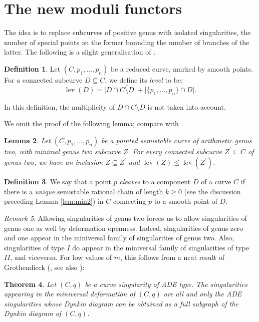 \documentclass{compositio}
\newcommand{\lev}{\operatorname{lev}}
\theoremstyle{plain}
\newtheorem{thm}{Theorem}[section]
\newtheorem{lem}[thm]{Lemma}
\theoremstyle{definition}
\newtheorem{definition}[thm]{Definition}
\theoremstyle{remark}
\newtheorem{rem}[thm]{Remark}
\begin{document}
\section{The new moduli functors}\label{sec:stability}
The idea is to replace subcurves of positive genus with isolated singularities, the number of special points on the former bounding the number of branches of the latter. The following is a slight generalisation of \cite[Definition 3.4]{SMY1}.
\begin{definition}
 Let $(C,p_1,\ldots,p_n)$ be a reduced curve, marked by smooth points. For a connected subcurve $D\subseteq C$, we define its \emph{level} to be: \[ \lev(D)=\lvert D\cap\overline{C\setminus D}\rvert+\lvert\{p_1,\ldots,p_n\}\cap D\rvert.\]
\end{definition}
In this definition, the multiplicity of $D\cap\overline{C\setminus D}$ is not taken into account.

We omit the proof of the following lemma; compare with \cite[Corollary 3.2, Lemma 3.5]{SMY1}.
\begin{lem}
 Let $(C,p_1,\ldots,p_n)$ be a pointed \emph{semistable} curve of arithmetic genus two, with minimal genus two subcurve $Z$. For every connected subcurve $Z^\prime\subseteq C$ of genus two, we have an inclusion $Z\subseteq Z^\prime$ and $\lev(Z)\leq\lev(Z^\prime)$.
\end{lem}

\begin{definition}
We say that a point $p$ \emph{cleaves} to a component $D$ of a curve $C$ if there is a \emph{unique} semistable rational chain of length $k\geq 0$ (see the discussion preceding Lemma \ref{lem:min2}) in $C$ connecting $p$ to a smooth point of $D$. 
\end{definition}


\begin{rem}
 Allowing singularities of genus two forces us to allow singularities of genus one as well by deformation openness. Indeed, singularities of genus zero and one appear in the miniversal family of singularities of genus two. Also, singularities of type $I$ do appear in the miniversal family of singularities of type $I\!I$, and viceversa. For low values of $m$, this follows from a neat result of Grothendieck (\cite[p. 2277]{C-ML}, see also \cite{Arnold,Demazure}):
 \begin{thm}\label{thm:ADE}
  Let $(C,q)$ be a curve singularity of ADE type. The singularities appearing in the miniversal deformation of $(C,q)$ are all and only the ADE singularities whose Dynkin diagram can be obtained as a full subgraph of the Dynkin diagram of $(C,q)$.
 \end{thm}
\end{rem}
\end{document}
